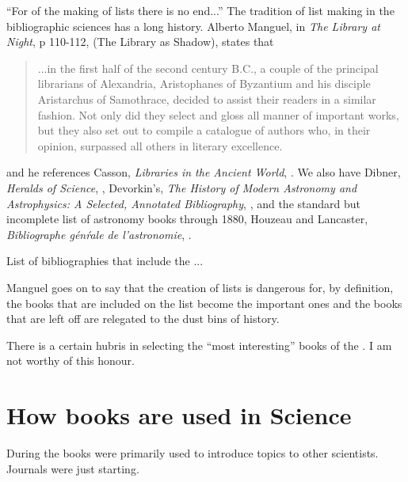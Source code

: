 


``For of the making of lists there is no end...'' The tradition of
list making in the bibliographic sciences has a long history.  Alberto
Manguel, in \emph{The Library at Night}, p 110-112, (The Library as
Shadow), states that
\begin{quote}
...in the first half of the second century B.C., a couple of the
  principal librarians of Alexandria, Aristophanes of Byzantium and
  his disciple Aristarchus of Samothrace, decided to assist their
  readers in a similar fashion.  Not only did they select and gloss
  all manner of important works, but they also set out to compile a
  catalogue of authors who, in their opinion, surpassed all others in
  literary excellence. \cite{manguel:2008}
\end{quote}
and he references Casson, \emph{Libraries in the Ancient World},
\cite{casson:2001}.  We also have Dibner, \emph{Heralds of Science},
\cite{dibner:1955}, Devorkin's, \emph{The History of Modern Astronomy
  and Astrophysics: A Selected, Annotated Bibliography},
\cite{devorkin:1982}, and the standard but incomplete list of
astronomy books through 1880, Houzeau and Lancaster,
\emph{Bibliographe g\'{e}n\'{r}ale de l'astronomie},
\cite{houzeau:1882}.

List of bibliographies that include the ...

Manguel goes on to say that the creation of lists is dangerous for, by
definition, the books that are included on the list become the
important ones and the books that are left off are relegated to the
dust bins of history.

There is a certain hubris in selecting the ``most interesting'' books
of the . I am not worthy of this honour.

\section{How books are used in Science}
During the  books were primarily used to introduce topics to
other scientists.  Journals were just starting.

